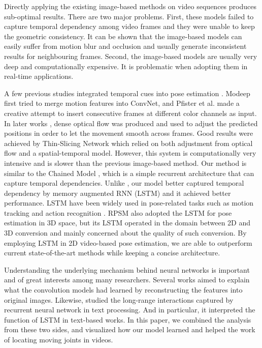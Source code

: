 \documentclass[10pt,twocolumn,letterpaper]{article}
\begin{document}
Directly applying the existing image-based methods on video sequences produces sub-optimal results. There are two major problems. First, these models failed to capture temporal dependency among video frames and they were unable to keep the geometric consistency. It can be shown that the image-based models can easily suffer from motion blur and occlusion and usually generate inconsistent results for neighbouring frames. Second, the image-based models are usually very deep and computationally expensive. It is problematic when adopting them in real-time applications.

A few previous studies integrated temporal cues into pose estimation \cite{geor16chain,jain14modeep,lin2017recurrent,bruce15STjoint,pfister15flowadj,pfister14channel,song17flowAdjST}. Modeep \cite{jain14modeep} first tried to merge motion features into ConvNet, and Pfister et al. \cite{pfister14channel} made a creative attempt to insert consecutive frames at different color channels as input. In later works \cite{pfister15flowadj,song17flowAdjST}, dense optical flow \cite{wein13opFlow} was produced and used to adjust the predicted positions in order to let the movement smooth across frames. Good results were achieved by Thin-Slicing Network \cite{song17flowAdjST} which relied on both adjustment from optical flow and a spatial-temporal model. However, this system is computationally very intensive and is slower than the previous image-based method. Our method is similar to the Chained Model \cite{geor16chain}, which is a simple recurrent architecture that can capture temporal dependencies. Unlike \cite{geor16chain}, our
model better captured temporal
dependency by memory augmented RNN (LSTM) and it achieved better performance. LSTM have been widely used in pose-related tasks such as motion tracking and action recognition \cite{Frag2015dynamics,Jain2016srnn,liu2016spatio,Julieta2017motion}. RPSM \cite{lin2017recurrent} also adopted the LSTM for pose estimation in 3D space, but its LSTM operated in the domain between 2D and 3D conversion and mainly concerned about the quality of such conversion. By employing LSTM in 2D video-based pose estimation, we are able to outperform current state-of-the-art methods while keeping a concise architecture.

Understanding the underlying mechanism behind neural networks is important and of great interests among many researchers. Several works \cite{mah15visCNN,zeiler14visCNN} aimed to explain what the convolution models had learned by reconstructing the features into original images. Likewise, \cite{karp15visRNN} studied the long-range interactions captured by recurrent neural network in text processing. And in particular, it interpreted the function of LSTM in text-based works. In this paper, we combined the analysis from these two sides, and visualized how our model learned and helped the work of locating moving joints in videos.
\end{document}
